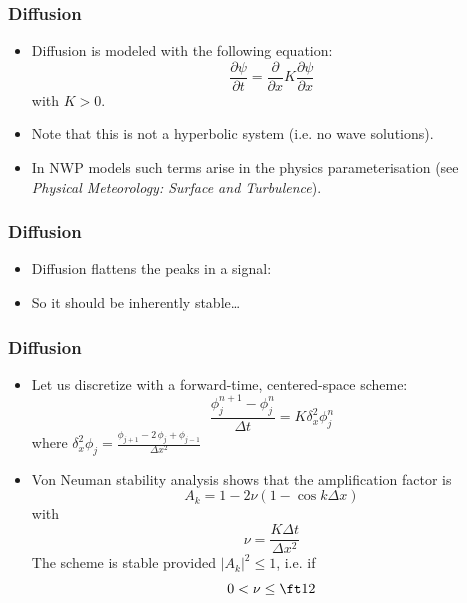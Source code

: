 \documentclass[aspectratio=149,9pt]{beamer}
\begin{document}
%
%
\begin{frame}
	\frametitle{Diffusion}
	\begin{itemize}
		\item Diffusion is modeled with the following equation:
			\begin{equation*}
				\frac{\partial \psi}{\partial t} = \frac{\partial}{\partial x} K \frac{\partial \psi}{\partial x}
			\end{equation*}
			with $K > 0$.\vspace*{2ex}
		\item Note that this is not a hyperbolic system (i.e. no wave solutions).\vspace*{2ex}
		\item In NWP models such terms arise in the physics parameterisation (see \emph{Physical Meteorology: Surface and Turbulence}).
	\end{itemize}
\end{frame}
%
%
\begin{frame}
	\frametitle{Diffusion}
	\begin{itemize}
		\item Diffusion flattens the peaks in a signal:
			\begin{center}
				\scalebox{.7}{}
			\end{center}
		\item So it should be inherently stable\ldots
	\end{itemize}
\end{frame}
%
%
\begin{frame}
	\frametitle{Diffusion}
	\begin{itemize}
		\item Let us discretize with a forward-time, centered-space scheme:
			\begin{equation*}
				\frac{\phi^{n+1}_j - \phi^n_j}{\Delta t} = K\delta_x^2\phi^n_j
			\end{equation*}
			where $\delta_x^2\phi_j=\frac{\phi_{j+1} - 2 \, \phi_j + \phi_{j-1}}{\Delta x^2}$
		\item Von Neuman stability analysis shows that the amplification factor is
			\begin{equation*}
				A_k = 1 - 2 \nu \left(
					1 - \cos k \Delta x
				\right)
			\end{equation*}
			with
			\begin{equation*}
				\nu = \frac{K \Delta t}{\Delta x^2}
			\end{equation*}
			The scheme is stable provided $\left|A_k\right|^2\le 1$, i.e. if
			\begin{equation*}
				0 < \nu \le \ft12
			\end{equation*}
	\end{itemize}
\end{frame}
\end{document}
